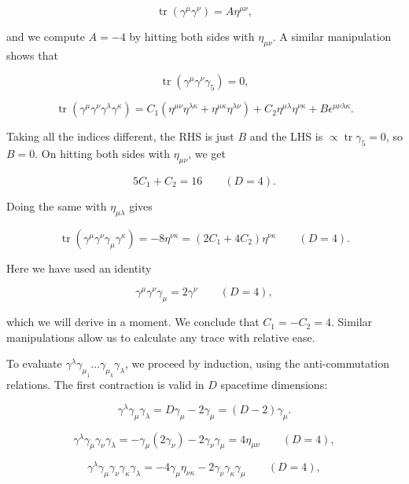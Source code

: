 \[
\operatorname{tr}(\gamma^\mu\gamma^\nu)=A\eta^{\mu\nu},
\]

and we compute $A=-4$ by hitting both sides with $\eta_{\mu\nu}$. A similar
manipulation shows that

\[
\operatorname{tr}(\gamma^\mu\gamma^\nu\gamma_5)=0,
\]

\[
\operatorname{tr}(\gamma^\mu\gamma^\nu\gamma^\lambda\gamma^\kappa)
=C_1(\eta^{\mu\nu}\eta^{\lambda\kappa}+\eta^{\mu\kappa}\eta^{\lambda\nu})
+C_2\eta^{\mu\lambda}\eta^{\nu\kappa}+B\epsilon^{\mu\nu\lambda\kappa}.
\]

Taking all the indices different, the RHS is just $B$ and the LHS is $\propto\operatorname{tr}\gamma_5=0$, so $B=0$.
On hitting both sides with $\eta_{\mu\nu}$, we get

\[
5C_1+C_2=16\qquad(D=4).
\]

Doing the same with $\eta_{\mu\lambda}$ gives

\[
\operatorname{tr}(\gamma^\mu\gamma^\nu\gamma_\mu\gamma^\kappa)
=-8\eta^{\nu\kappa}=(2C_1+4C_2)\eta^{\nu\kappa}
\qquad(D=4).
\]

Here we have used an identity

\[
\gamma^\mu\gamma^\nu\gamma_\mu=2\gamma^\nu\qquad(D=4),
\]

which we will derive in a moment. We conclude that $C_1=-C_2=4$.
Similar manipulations allow us to calculate any trace with relative ease.

To evaluate $\gamma^\lambda\gamma_{\mu_1}\ldots\gamma_{\mu_k}\gamma_\lambda$, we
proceed by induction, using the anti-commutation relations. The first
contraction is valid in $D$ spacetime dimensions:

\[
\gamma^\lambda\gamma_\mu\gamma_\lambda
=D\gamma_\mu-2\gamma_\mu=(D-2)\gamma_\mu.
\]

\[
\gamma^\lambda\gamma_\mu\gamma_\nu\gamma_\lambda
=-\gamma_\mu(2\gamma_\nu)-2\gamma_\nu\gamma_\mu
=4\eta_{\mu\nu}\qquad(D=4),
\]

\[
\gamma^\lambda\gamma_\mu\gamma_\nu\gamma_\kappa\gamma_\lambda
=-4\gamma_\mu\eta_{\nu\kappa}-2\gamma_\nu\gamma_\kappa\gamma_\mu
\qquad(D=4),
\]

